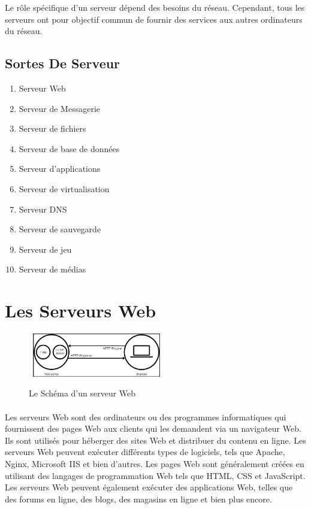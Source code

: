  Le rôle spécifique d'un serveur dépend des besoins du réseau. Cependant, tous les serveurs ont pour objectif commun de fournir des services aux autres ordinateurs du réseau.
 
 \subsection*{ Sortes De Serveur}
\begin{enumerate}
     \item Serveur Web
     \item Serveur de Messagerie
     \item Serveur de fichiers
     \item Serveur de base de données 
     \item Serveur d'applications
     \item Serveur de virtualisation
     \item Serveur DNS
     \item Serveur de sauvegarde 
     \item Serveur de jeu 
     \item Serveur de médias    
\end{enumerate}
 
  
\section{Les Serveurs Web}
 
\begin{figure}[h]
	\hbox{
	\includegraphics[width=0.5\textwidth]{PhotoMemoire/Server_web.png}}
\caption{Le Schéma d'un serveur Web}
\end{figure}
\paragraph{ }
Les serveurs Web sont des ordinateurs ou des programmes informatiques qui fournissent des pages Web aux clients qui les demandent via un navigateur Web. Ils sont utilisés pour héberger des sites Web et distribuer du contenu en ligne. Les serveurs Web peuvent exécuter différents types de logiciels, tels que Apache, Nginx, Microsoft IIS et bien d'autres. Les pages Web sont généralement créées en utilisant des langages de programmation Web tels que HTML, CSS et JavaScript. Les serveurs Web peuvent également exécuter des applications Web, telles que des forums en ligne, des blogs, des magasins en ligne et bien plus encore.


